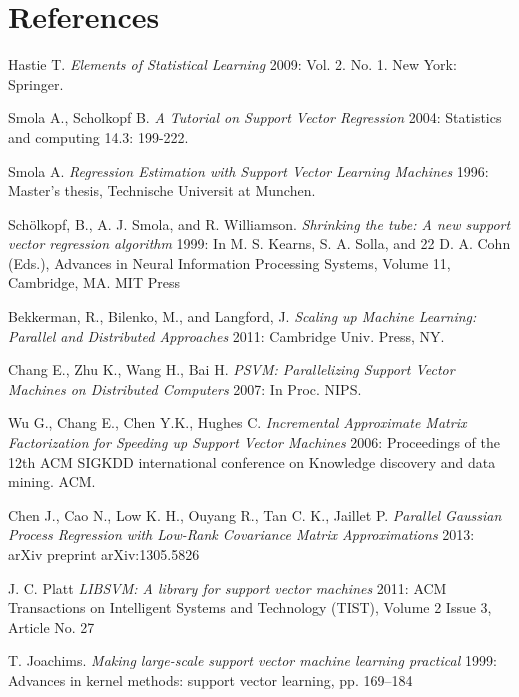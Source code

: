 \documentclass[12pt]{article}
\begin{document}
\section{References}
\renewcommand{\section}[2]{}%
 \begin{thebibliography}{}
 
 Hastie T. {\em Elements of Statistical Learning} 2009:  Vol. 2. No. 1. New York: Springer.
    
  Smola A.,  Scholkopf B. {\em A Tutorial on Support Vector Regression} 2004:  Statistics and computing 14.3: 199-222.
  
 Smola A. {\em Regression
Estimation with Support Vector Learning Machines} 1996: Master's thesis, Technische Universit at Munchen.


Sch\"olkopf, B., A. J. Smola, and R. Williamson. {\em Shrinking the tube: A new support vector regression algorithm} 1999: In M. S. Kearns, S. A. Solla, and 22 D. A. Cohn (Eds.), Advances in Neural Information Processing Systems, Volume 11, Cambridge, MA. MIT Press

\bibitem{}Bekkerman, R., Bilenko, M., and Langford, J. {\em Scaling up Machine Learning: Parallel and Distributed Approaches} 2011: Cambridge Univ. Press, NY.

 Chang E., Zhu K., Wang H., Bai H.  {\em PSVM: Parallelizing Support Vector Machines on Distributed Computers} 2007: In Proc. NIPS.
 
  Wu G., Chang E., Chen Y.K., Hughes C.  {\em Incremental Approximate Matrix Factorization for Speeding up Support Vector Machines} 2006: Proceedings of the 12th ACM SIGKDD international conference on Knowledge discovery and data mining. ACM.

  Chen J., Cao N., Low K. H.,  Ouyang R., Tan C. K., Jaillet P.  {\em Parallel Gaussian Process Regression with Low-Rank Covariance Matrix Approximations} 2013: arXiv preprint arXiv:1305.5826
 
J. C. Platt {\em LIBSVM: A library for support vector machines} 2011: ACM Transactions on Intelligent Systems and Technology (TIST), Volume 2 Issue 3, Article No. 27	

T. Joachims. {\em Making large-scale support vector machine learning practical} 1999: Advances in kernel methods: support vector learning, pp. 169–184


\end{thebibliography}
\end{document}

